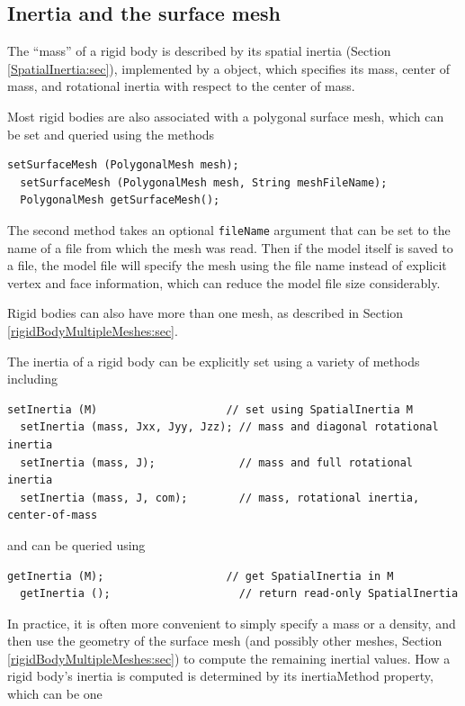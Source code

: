 \subsection{Inertia and the surface mesh}
\label{rigidBodyInertia:sec}

The ``mass'' of a rigid body is described by its spatial inertia
(Section \ref{SpatialInertia:sec}), implemented by a
 object, which
specifies its mass, center of mass, and rotational inertia with
respect to the center of mass.

Most rigid bodies are also associated with a polygonal surface mesh,
which can be set and queried using the methods
%
\begin{lstlisting}[]
  setSurfaceMesh (PolygonalMesh mesh);
  setSurfaceMesh (PolygonalMesh mesh, String meshFileName);
  PolygonalMesh getSurfaceMesh();
\end{lstlisting}
%
The second method takes an optional {\tt fileName} argument that can
be set to the name of a file from which the mesh was read. Then if the
model itself is saved to a file, the model file will specify the mesh
using the file name instead of explicit vertex and face information,
which can reduce the model file size considerably.

Rigid bodies can also have more than one mesh, as described
in Section \ref{rigidBodyMultipleMeshes:sec}.

The inertia of a rigid body can be explicitly set using a variety
of methods including
%
\begin{lstlisting}[]
  setInertia (M)                    // set using SpatialInertia M
  setInertia (mass, Jxx, Jyy, Jzz); // mass and diagonal rotational inertia
  setInertia (mass, J);             // mass and full rotational inertia
  setInertia (mass, J, com);        // mass, rotational inertia, center-of-mass
\end{lstlisting}
%
and can be queried using 
%
\begin{lstlisting}[]
  getInertia (M);                   // get SpatialInertia in M
  getInertia ();                    // return read-only SpatialInertia
\end{lstlisting}
%

In practice, it is often more convenient to simply specify a mass or a
density, and then use the geometry of the surface mesh (and possibly
other meshes, Section \ref{rigidBodyMultipleMeshes:sec}) to compute
the remaining inertial values. How a rigid body's inertia is computed
is determined by its {\sf inertiaMethod} property, which can be one

